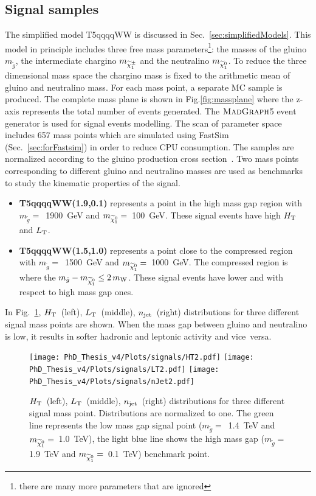 \subsection{Signal samples}
\label{signalSamples}
The simplified model T5qqqqWW is discussed in Sec.~\ref{sec:simplifiedModels}. This model in principle includes three free mass parameters\footnote{there are many more parameters that are ignored}: the masses of the gluino $m_{\tilde{g}}$, the intermediate chargino $m_{\widetilde{\chi}^{\pm}_1}$ and the neutralino $m_{\widetilde{\chi}^0_1}$. To reduce the three dimensional mass space the chargino mass is fixed to the arithmetic mean of gluino and neutralino mass. For each mass point, a separate MC sample is produced. The complete mass plane is shown in  Fig.\ref{fig:massplane} where the z-axis represents the total number of events generated. The $\textsc{MadGraph}$5 event generator is used for signal events modelling. The scan of parameter space includes 657 mass points which are simulated using FastSim (Sec.~\ref{sec:forFastsim}) in order to reduce CPU consumption. The samples are normalized according to the gluino production cross section~\cite{gluxsec2}.
Two mass points corresponding to different gluino and neutralino masses are used as benchmarks to study the kinematic properties of the signal.
\begin{itemize}
\item \textbf{T5qqqqWW(1.9,0.1)} represents a point in the high mass gap region with $m_{\tilde{g}}=$~1900~GeV and $m_{\widetilde{\chi}^0_1}=$~100~GeV. These signal events have high $\HT$ and $\LT$.
\item \textbf{T5qqqqWW(1.5,1.0)} represents a point close to the compressed region with $m_{\tilde{g}}=$~1500~GeV and $m_{\widetilde{\chi}^0_1}=$~1000~GeV. The compressed region is where the $m_{\tilde{g}}-m_{\widetilde{\chi}^0_1}\leq2\,m_{\rm W}$. These signal events have lower {\HT} and {\LT} with respect to high mass gap ones.
\end{itemize}
In Fig.~\ref{fig:signalKin}, $\HT$~(left), $\LT$~(middle), $\njet$~(right) distributions for three different signal mass points are shown. When the mass gap between gluino and neutralino is low, it results in softer hadronic and leptonic activity and vice~versa.\\
\begin{figure}[!h]
\centering
  \texttt{[image: PhD\_Thesis\_v4/Plots/signals/HT2.pdf]}
  \texttt{[image: PhD\_Thesis\_v4/Plots/signals/LT2.pdf]}
  \texttt{[image: PhD\_Thesis\_v4/Plots/signals/nJet2.pdf]}
  \caption[$\HT$~(left), $\LT$~(middle), $\njet$~(right) distributions for three different signal mass point]{\label{fig:signalKin}  $\HT$~(left), $\LT$~(middle), $\njet$~(right) distributions for three different signal mass point. Distributions are normalized to one. The green line represents the low mass gap signal point ($m_{\tilde{g}}=$~1.4~TeV and $m_{\widetilde{\chi}^0_1}=$~1.0~TeV), the light blue line shows the high mass gap ($m_{\tilde{g}}=$1.9~TeV and $m_{\widetilde{\chi}^0_1}=$~0.1~TeV) benchmark point.
  }
\end{figure}
